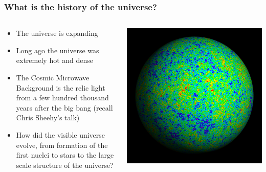 \documentclass{beamer}
\begin{document}
\frame
{

    \frametitle{What is the history of the universe?}


    \begin{columns}
        \begin{column}{0.5\textwidth}
            \begin{itemize}

                \item The universe is expanding

                \item Long ago the universe
                    was extremely hot and dense

                \item The Cosmic Microwave Background is the relic light from
                    a few hundred thousand years after the big bang (recall
                    Chris Sheehy's talk)

                \item How did the visible universe evolve, from formation of
                    the first nuclei to stars to the large scale structure of
                    the universe?


            \end{itemize}
        \end{column}
        \begin{column}{0.5\textwidth}
            \begin{center}
                \includegraphics[width=\textwidth]{wiener3yr_map_2284x2284.jpg}
            \end{center}
        \end{column}
    \end{columns}


}
\end{document}
